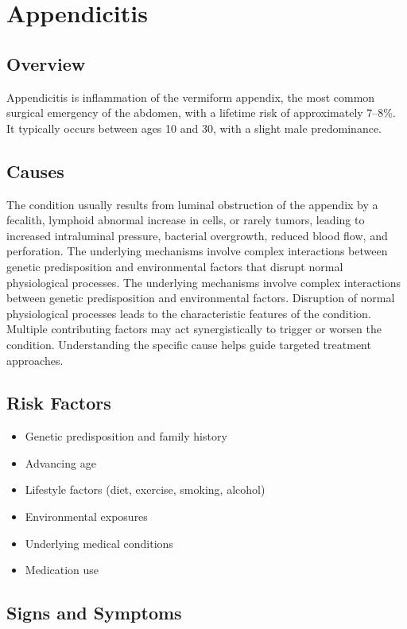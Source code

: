 \chapter{Appendicitis}
\label{sec:Appendicitis}

\section{Overview}
Appendicitis is inflammation of the vermiform appendix, the most common surgical emergency of the abdomen, with a lifetime risk of approximately 7--8\%. It typically occurs between ages 10 and 30, with a slight male predominance.
\section{Causes}
The condition usually results from luminal obstruction of the appendix by a fecalith, lymphoid abnormal increase in cells, or rarely tumors, leading to increased intraluminal pressure, bacterial overgrowth, reduced blood flow, and perforation. The underlying mechanisms involve complex interactions between genetic predisposition and environmental factors that disrupt normal physiological processes. The underlying mechanisms involve complex interactions between genetic predisposition and environmental factors. Disruption of normal physiological processes leads to the characteristic features of the condition. Multiple contributing factors may act synergistically to trigger or worsen the condition. Understanding the specific cause helps guide targeted treatment approaches.
\section{Risk Factors}


\begin{itemize}[noitemsep]
  \item Genetic predisposition and family history
  \item Advancing age
  \item Lifestyle factors (diet, exercise, smoking, alcohol)
  \item Environmental exposures
  \item Underlying medical conditions
  \item Medication use
\end{itemize}
\section{Signs and Symptoms}

